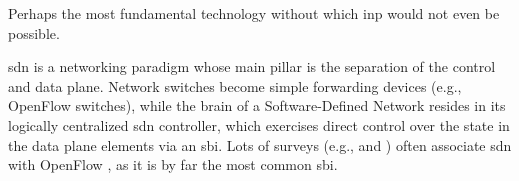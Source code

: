 Perhaps the most fundamental technology without which \gls{inp} would not even be possible.

\gls{sdn} is a networking paradigm whose main pillar is the separation of the control and data plane.
Network switches become simple forwarding devices (e.g., OpenFlow \cite{openflow} switches), while the brain of a Software-Defined Network resides in its logically centralized \gls{sdn} controller, which exercises direct control over the state in the data plane elements via an \gls{sbi}.
Lots of surveys (e.g., \cite{kreutz2014software} and \cite{kim2013improving}) often associate \gls{sdn} with OpenFlow \cite{openflow}, as it is by far the most common \gls{sbi}.